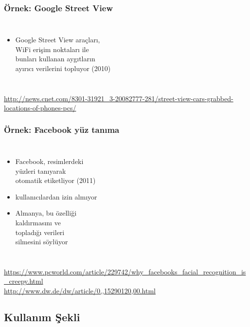 \documentclass[dvipsnames]{beamer}
\theoremstyle{definition}
\theoremstyle{example}
\theoremstyle{plain}
\begin{document}
\begin{frame}
  \frametitle{Örnek: Google Street View}

  \begin{columns}

    \begin{itemize}
      \item Google Street View araçları,\\
        WiFi erişim noktaları ile\\
        bunları kullanan aygıtların\\
        ayırıcı verilerini topluyor (2010)
    \end{itemize}
  \end{columns}

  \medskip
  \tiny{\url{http://news.cnet.com/8301-31921_3-20082777-281/street-view-cars-grabbed-locations-of-phones-pcs/}}\\
\end{frame}

\begin{frame}
  \frametitle{Örnek: Facebook yüz tanıma}

  \begin{columns}

    \begin{itemize}
      \item Facebook, resimlerdeki\\
        yüzleri tanıyarak\\
        otomatik etiketliyor (2011)
      \item kullanıcılardan izin almıyor
      \item Almanya, bu özelliği\\
        kaldırmasını ve\\
        topladığı verileri\\
        silmesini söylüyor
    \end{itemize}
  \end{columns}

  \medskip
  \tiny{\url{https://www.pcworld.com/article/229742/why_facebooks_facial_recognition_is_creepy.html}}\\
  \tiny{\url{http://www.dw.de/dw/article/0,,15290120,00.html}}\\
\end{frame}

\subsection{Kullanım Şekli}
\end{document}
